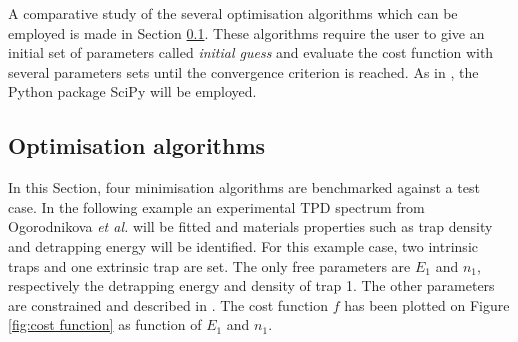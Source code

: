 A comparative study of the several optimisation algorithms which can be employed is made in Section \ref{optimisation algorithms}.
These algorithms require the user to give an initial set of parameters called \textit{initial guess} and evaluate the cost function with several parameters sets until the convergence criterion is reached.
As in , the Python package SciPy  will be employed.

\subsection{Optimisation algorithms} \label{optimisation algorithms}
In this Section, four minimisation algorithms are benchmarked against a test case.
In the following example an experimental TPD spectrum from Ogorodnikova \textit{et al.}  will be fitted and materials properties such as trap density and detrapping energy will be identified.
For this example case, two intrinsic traps and one extrinsic trap are set.
The only free parameters are $E_1$ and $n_1$, respectively the detrapping energy and density of trap 1.
The other parameters are constrained and described in .
The cost function $f$ has been plotted on Figure \ref{fig:cost function} as function of $E_1$ and $n_1$.

